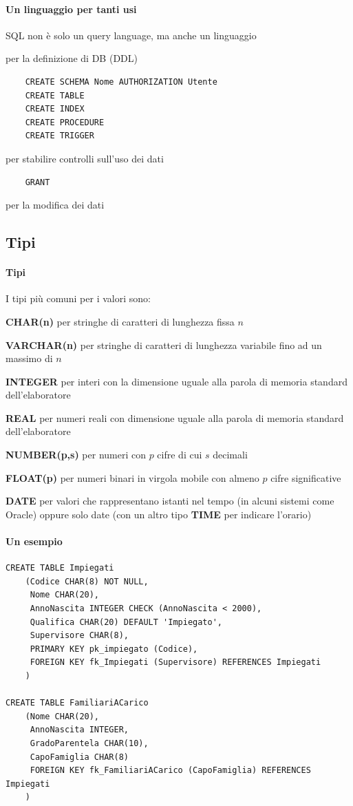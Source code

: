 \documentclass[10pt]{book}
\begin{document}
\paragraph{Un linguaggio per tanti usi} SQL non è solo un query language, ma anche un linguaggio
\begin{list}{}{}
	\item per la definizione di DB (DDL)
	\begin{lstlisting}
	CREATE SCHEMA Nome AUTHORIZATION Utente
	CREATE TABLE
	CREATE INDEX
	CREATE PROCEDURE
	CREATE TRIGGER
	\end{lstlisting}
	\item per stabilire controlli sull'uso dei dati
	\begin{lstlisting}
	GRANT
	\end{lstlisting}
	\item per la modifica dei dati
\end{list}
\subsection{Tipi}
\paragraph{Tipi} I tipi più comuni per i valori sono:
\begin{list}{}{}
	\item \textbf{CHAR(n)} per stringhe di caratteri di lunghezza fissa $n$
	\item \textbf{VARCHAR(n)} per stringhe di caratteri di lunghezza variabile fino ad un massimo di $n$
	\item \textbf{INTEGER} per interi con la dimensione uguale alla parola di memoria standard dell'elaboratore
	\item \textbf{REAL} per numeri reali con dimensione uguale alla parola di memoria standard dell'elaboratore
	\item \textbf{NUMBER(p,s)} per numeri con $p$ cifre di cui $s$ decimali
	\item \textbf{FLOAT(p)} per numeri binari in virgola mobile con almeno $p$ cifre significative
	\item \textbf{DATE} per valori che rappresentano istanti nel tempo (in alcuni sistemi come Oracle) oppure solo date (con un altro tipo \textbf{TIME} per indicare l'orario)
\end{list}
\paragraph{Un esempio} 
\begin{lstlisting}
CREATE TABLE Impiegati
	(Codice CHAR(8) NOT NULL,
	 Nome CHAR(20),
	 AnnoNascita INTEGER CHECK (AnnoNascita < 2000),
	 Qualifica CHAR(20) DEFAULT 'Impiegato',
	 Supervisore CHAR(8),
	 PRIMARY KEY pk_impiegato (Codice),
	 FOREIGN KEY fk_Impiegati (Supervisore) REFERENCES Impiegati
	)
	
CREATE TABLE FamiliariACarico
	(Nome CHAR(20),
	 AnnoNascita INTEGER,
	 GradoParentela CHAR(10),
	 CapoFamiglia CHAR(8)
	 FOREIGN KEY fk_FamiliariACarico (CapoFamiglia) REFERENCES Impiegati
	)
\end{lstlisting}
\end{document}
